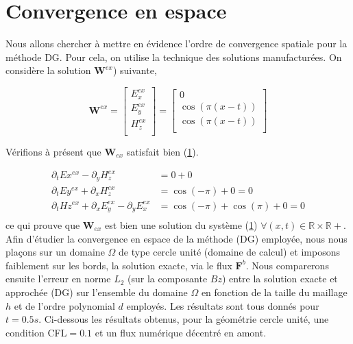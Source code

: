 \documentclass[a4paper,oneside,10pt]{report}
\begin{document}
\section{Convergence en espace}

Nous allons chercher à mettre en évidence l'ordre de convergence spatiale pour la méthode DG. Pour cela, on utilise la technique des solutions manufacturées. On considère la solution $\mathbf{W}^{ex}$) suivante,

\begin{equation}
\mathbf{W}^{ex}=
\begin{bmatrix}
E_x^{ex}\\
E_y^{ex}\\
H_z^{ex}\\
\end{bmatrix}
=
\begin{bmatrix}
0\\
\cos(\pi(x-t))\\
\cos(\pi(x-t))\\
\end{bmatrix}
\end{equation}

Vérifions à présent que $\mathbf{W}_{ex}$ satisfait bien (\ref{}).


\begin{equation}
\begin{aligned}
\partial_t Ex^{ex} - \partial_y H_z^{ex} &= 0 + 0\\
\partial_t Ey^{ex} + \partial_x H_z^{ex} &= \cos(-\pi) + 0 = 0\\
\partial_t Hz^{ex} + \partial_x E_y^{ex} - \partial_y E_x^{ex}  &= \cos(-\pi) + \cos(\pi) + 0 = 0\\
\end{aligned}
\end{equation}
ce qui prouve que $\mathbf{W}_{ex}$ est bien une solution du système (\ref{}) $\forall (x,t) \in \mathbb{R} \times \mathbb{R}+$.\\


Afin d'étudier la convergence en espace de la méthode (DG) employée, nous nous plaçons sur un domaine $\Omega$ de type cercle unité (domaine de calcul) et imposons faiblement sur les bords, la solution exacte, via le flux $\mathbf{F}^b$.
 Nous comparerons ensuite l'erreur en norme $L_2$ (sur la composante $Bz$) entre la solution exacte et approchée (DG) sur l'ensemble du domaine $\Omega$ en fonction de la taille du maillage $h$ et de l'ordre polynomial $d$ employés. Les résultats sont tous donnés pour $t=0.5s$. Ci-dessous les résultats obtenus, pour la géométrie cercle unité, une condition CFL$=0.1$ et un flux numérique décentré en amont.
\end{document}
